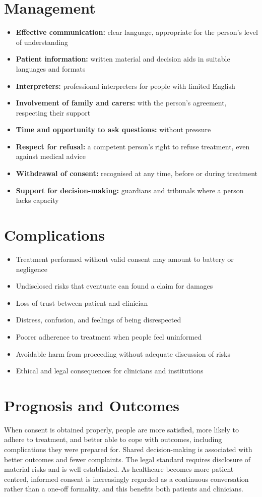 \section*{Management}
\begin{itemize}
    \item \textbf{Effective communication:} clear language, appropriate for the person's level of understanding
    \item \textbf{Patient information:} written material and decision aids in suitable languages and formats
    \item \textbf{Interpreters:} professional interpreters for people with limited English
    \item \textbf{Involvement of family and carers:} with the person's agreement, respecting their support
    \item \textbf{Time and opportunity to ask questions:} without pressure
    \item \textbf{Respect for refusal:} a competent person's right to refuse treatment, even against medical advice
    \item \textbf{Withdrawal of consent:} recognised at any time, before or during treatment
    \item \textbf{Support for decision-making:} guardians and tribunals where a person lacks capacity
\end{itemize}

\section*{Complications}
\begin{itemize}
    \item Treatment performed without valid consent may amount to battery or negligence
    \item Undisclosed risks that eventuate can found a claim for damages
    \item Loss of trust between patient and clinician
    \item Distress, confusion, and feelings of being disrespected
    \item Poorer adherence to treatment when people feel uninformed
    \item Avoidable harm from proceeding without adequate discussion of risks
    \item Ethical and legal consequences for clinicians and institutions
\end{itemize}

\section*{Prognosis and Outcomes}
When consent is obtained properly, people are more satisfied, more likely to adhere to treatment, and better able to cope with outcomes, including complications they were prepared for. Shared decision-making is associated with better outcomes and fewer complaints. The legal standard requires disclosure of material risks and is well established. As healthcare becomes more patient-centred, informed consent is increasingly regarded as a continuous conversation rather than a one-off formality, and this benefits both patients and clinicians.

